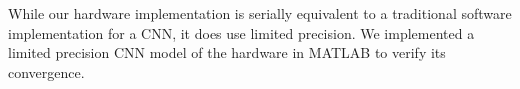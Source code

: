 While our hardware implementation is serially equivalent to a traditional software implementation for a CNN, it does use limited precision. We implemented a limited precision CNN model of the hardware in MATLAB to verify its convergence.